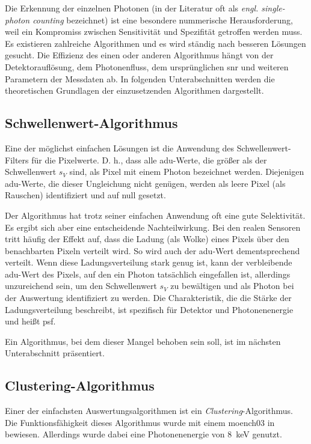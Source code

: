 \noindent
Die Erkennung der einzelnen Photonen (in der Literatur oft als \emph{engl. single-photon counting} bezeichnet) ist eine besondere nummerische Herausforderung, weil ein Kompromiss zwischen Sensitivität und Spezifität getroffen werden muss. Es existieren zahlreiche Algorithmen und es wird ständig nach besseren Lösungen gesucht. Die Effizienz des einen oder anderen Algorithmus hängt von der Detektorauflösung, dem Photonenfluss, dem ursprünglichen \gls{snr} und weiteren Parametern der Messdaten ab. In folgenden Unterabschnitten werden die theoretischen Grundlagen der einzusetzenden Algorithmen dargestellt.

\subsection{Schwellenwert-Algorithmus}
\label{text:threshold_algorithm}
Eine der möglichst einfachen Lösungen ist die Anwendung des Schwellenwert-Filters für die Pixelwerte. D. h., dass alle \gls{adu}-Werte, die größer als der Schwellenwert $s_V$ sind, als Pixel mit einem Photon bezeichnet werden. Diejenigen \gls{adu}-Werte, die dieser Ungleichung nicht genügen, werden als leere Pixel (als Rauschen) identifiziert und auf null gesetzt.

\noindent
Der Algorithmus hat trotz seiner einfachen Anwendung oft eine gute Selektivität. Es ergibt sich aber eine entscheidende Nachteilwirkung. Bei den realen Sensoren tritt häufig der Effekt auf, dass die Ladung (als Wolke) eines Pixels über den benachbarten Pixeln verteilt wird. So wird auch der \gls{adu}-Wert dementsprechend verteilt. Wenn diese Ladungsverteilung  stark genug ist, kann der verbleibende \gls{adu}-Wert des Pixels, auf den ein Photon tatsächlich eingefallen ist, allerdings unzureichend sein, um den Schwellenwert $s_V$ zu bewältigen und als Photon bei der Auswertung identifiziert zu werden. Die Charakteristik, die die Stärke der Ladungsverteilung beschreibt, ist spezifisch für Detektor und Photonenenergie und heißt \gls{psf}.

\noindent
Ein Algorithmus, bei dem dieser Mangel behoben sein soll, ist im nächsten Unterabschnitt präsentiert.

\subsection{Clustering-Algorithmus}
\label{text:clustering_algorithm}
Einer der einfachsten Auswertungsalgorithmen ist ein \emph{Clustering}-Algorithmus. Die Funktionsfähigkeit dieses Algorithmus wurde mit einem \gls{moench03} in \cite{cartier_micron_2014} bewiesen. Allerdings wurde dabei eine Photonenenergie von \SI{8}{\kilo\eV} genutzt. 

